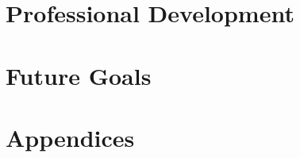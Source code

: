 \documentclass{article}
\begin{document}
\section{Professional Development}
\section{Future Goals}

\appendix
\section*{Appendices}
\section{}
\end{document}
